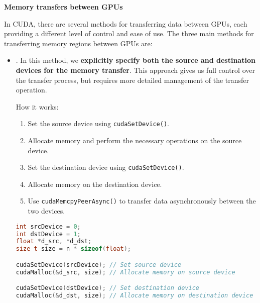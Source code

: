 \begin{flushleft}
  \textcolor{Green3}{ \textbf{Memory transfers between GPUs}}
\end{flushleft}
In CUDA, there are several methods for transferring data between GPUs, each providing a different level of control and ease of use. The three main methods for transferring memory regions between GPUs are:
\begin{itemize}
  \item {}. In this method, we \textbf{explicitly specify both the source and destination devices for the memory transfer}. This approach gives us full control over the transfer process, but requires more detailed management of the transfer operation.

  How it works:
  \begin{enumerate}
    \item Set the source device using \texttt{cudaSetDevice()}.
    \item Allocate memory and perform the necessary operations on the source device.
    \item Set the destination device using \texttt{cudaSetDevice()}.
    \item Allocate memory on the destination device.
    \item Use \texttt{cudaMemcpyPeerAsync()} to transfer data asynchronously between the two devices.
  \end{enumerate}
  \begin{examplebox}
    \begin{lstlisting}[language=C++]
int srcDevice = 0;
int dstDevice = 1;
float *d_src, *d_dst;
size_t size = n * sizeof(float);

cudaSetDevice(srcDevice); // Set source device
cudaMalloc(&d_src, size); // Allocate memory on source device

cudaSetDevice(dstDevice); // Set destination device
cudaMalloc(&d_dst, size); // Allocate memory on destination device


\end{lstlisting}
\end{examplebox}
\end{itemize}
